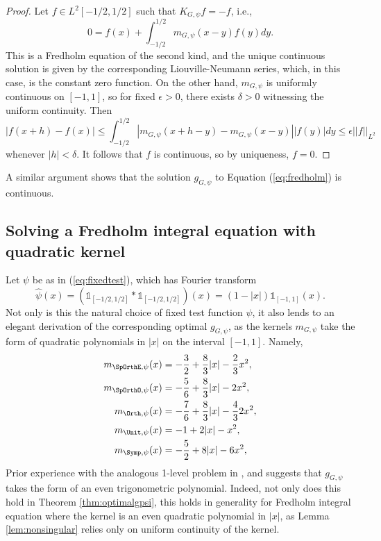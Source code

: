 \begin{proof}
	Let $f \in L^2 [-1/2, 1/2]$ such that $K_{G, \psi} f = -f$, i.e.,
		\[ 0 = f(x) + \int_{-1/2}^{1/2} m_{G, \psi} (x - y) f(y) dy. \]
	This is a Fredholm equation of the second kind, and the unique continuous solution is given by the corresponding Liouville-Neumann series, which, in this case, is the constant zero function. On the other hand, $m_{G, \psi}$ is uniformly continuous on $[-1, 1]$, so for fixed $\epsilon > 0$, there exists $\delta > 0$ witnessing the uniform continuity. Then 
		\[ |f(x + h) - f(x)| \leq \int_{-1/2}^{1/2} |m_{G, \psi} (x + h - y) - m_{G, \psi}(x - y)| |f(y)| dy \leq \epsilon ||f||_{L^2} \]
	whenever $|h| < \delta$. It follows that $f$ is continuous, so by uniqueness, $f = 0$. 	
\end{proof}

\begin{remark}
	A similar argument shows that the solution $g_{G, \psi}$ to Equation (\ref{eq:fredholm}) is continuous. 
\end{remark}

\subsection{Solving a Fredholm integral equation with quadratic kernel} \label{sec:quadker}

Let $\psi$ be as in (\ref{eq:fixedtest}), which has Fourier transform
	\begin{equation}	
		\widehat \psi (x) = (\mathbb 1_{[-1/2, 1/2]} * \mathbb 1_{[-1/2, 1/2]})(x) = (1 - |x|) \mathbb 1_{[-1, 1]} (x). 
	\end{equation}	
Not only is this the natural choice of fixed test function $\psi$, it also lends to an elegant derivation of the corresponding optimal $g_{G, \psi}$, as the kernels $m_{G, \psi}$ take the form of quadratic polynomials in $|x|$ on the interval $[-1, 1]$. Namely, 
\begin{align}
	m_{\SpOrthE, \psi} (x)
		&= -\frac32 + \frac83 |x| - \frac23 x^2, \\
	m_{\SpOrthO, \psi} (x) 
		&= -\frac{5}{6} + \frac83 |x| - 2 x^2, \\
	m_{\Orth, \psi} (x)
		&= -\frac76 + \frac83 |x| -\frac43 2x^2, \\
	m_{\Unit, \psi} (x)
		&= -1 + 2 |x| - x^2,\\
	m_{\Symp, \psi} (x)
		&= - \frac52 + 8|x| - 6 x^2,
\end{align}
Prior experience with the analogous 1-level problem in \cite{ILS}, \cite{FreemanThesis} and \cite{FreemanMiller} suggests that $g_{G, \psi}$ takes the form of an even trigonometric polynomial. Indeed, not only does this hold in Theorem \ref{thm:optimalgpsi}, this holds in generality for Fredholm integral equation where the kernel is an even quadratic polynomial in $|x|$, as Lemma \ref{lem:nonsingular} relies only on uniform continuity of the kernel. 

